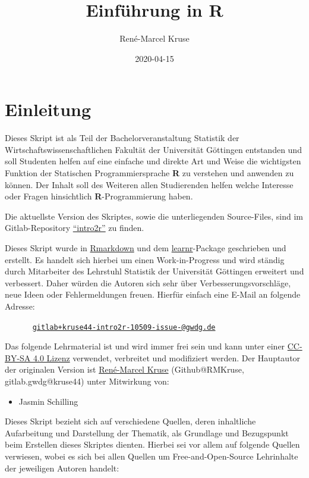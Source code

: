 \documentclass[
]{book}
\title{Einführung in R}
\author{René-Marcel Kruse}
\date{2020-04-15}
\providecommand{\tightlist}{%
  \setlength{\itemsep}{0pt}\setlength{\parskip}{0pt}}
\begin{document}
\maketitle

{
\setcounter{tocdepth}{1}
\tableofcontents
}
\hypertarget{einleitung}{%
\chapter*{Einleitung}\label{einleitung}}

Dieses Skript ist als Teil der Bachelorveranstaltung Statistik der Wirtschaftswissenschaftlichen Fakultät der Universität Göttingen entstanden und soll Studenten helfen auf eine einfache und direkte Art und Weise die wichtigsten Funktion der Statischen Programmiersprache \textbf{R} zu verstehen und anwenden zu können. Der Inhalt soll des Weiteren allen Studierenden helfen welche Interesse oder Fragen hinsichtlich \textbf{R}-Programmierung haben.

Die aktuellste Version des Skriptes, sowie die unterliegenden Source-Files, sind im Gitlab-Repository \href{https://gitlab.gwdg.de/kruse44/intro2r}{``intro2r''} zu finden.

Dieses Skript wurde in \href{https://rmarkdown.rstudio.com/}{Rmarkdown} und dem \href{https://rstudio.github.io/learnr/}{learnr}-Package geschrieben und erstellt. Es handelt sich hierbei um einen Work-in-Progress und wird ständig durch Mitarbeiter des Lehrstuhl Statistik der Universität Göttingen erweitert und verbessert. Daher würden die Autoren sich sehr über Verbesserungsvorschläge, neue Ideen oder Fehlermeldungen freuen. Hierfür einfach eine E-Mail an folgende Adresse:

    \href{mailto:gitlab+kruse44-intro2r-10509-issue-@gwdg.de}{\nolinkurl{gitlab+kruse44-intro2r-10509-issue-@gwdg.de}}

Das folgende Lehrmaterial ist und wird immer frei sein und kann unter einer \href{https://creativecommons.org/licenses/by-sa/4.0/deed.de}{CC-BY-SA 4.0 Lizenz} verwendet, verbreitet und modifiziert werden. Der Hauptautor der originalen Version ist \href{https://www.uni-goettingen.de/en/610058.html}{René-Marcel Kruse} (Github@RMKruse, gitlab.gwdg@kruse44) unter Mitwirkung von:

\begin{itemize}
\tightlist
\item
  Jasmin Schilling
\end{itemize}

Dieses Skript bezieht sich auf verschiedene Quellen, deren inhaltliche Aufarbeitung und Darstellung der Thematik, als Grundlage und Bezugspunkt beim Erstellen dieses Skriptes dienten. Hierbei sei vor allem auf folgende Quellen verwiesen, wobei es sich bei allen Quellen um Free-and-Open-Source Lehrinhalte der jeweiligen Autoren handelt:
\end{document}
